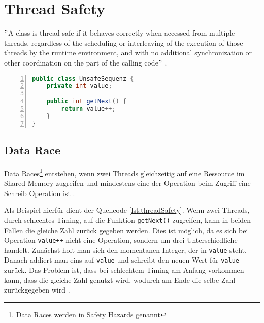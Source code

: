 \section{Thread Safety}\label{sec:threadSafety}

$"$A class is thread-safe if it behaves correctly when accessed from multiple threads, regardless of the scheduling or interleaving of the execution of those threads by the runtime environment, and with no additional synchronization or other coordination on the part of the calling code$"$ \cite[12]{brian}.

\begin{lstlisting}[language=Java,frame=tb,caption={Non-thread-safe Sequence Generator \cite{brian}}, label={lst:threadSafety}, numbers=left, stepnumber=1]
public class UnsafeSequenz {
	private int value;

	public int getNext() {
		return value++;
	}
}
\end{lstlisting}

\subsection*{Data Race}

Data Races\footnote{Data Races werden in \cite{brian} Safety Hazards genannt} entstehen, wenn zwei Threads gleichzeitig auf eine Ressource im Shared Memory zugreifen und mindestens eine der Operation beim Zugriff eine Schreib Operation ist \cite[vgl.][72]{banerjee_theory_2006}. 

Als Beispiel hierfür dient der Quellcode \ref{lst:threadSafety}. Wenn zwei Threads, durch schlechtes Timing, auf die Funktion \texttt{getNext()} zugreifen, kann in beiden Fällen die gleiche Zahl zurück gegeben werden. Dies ist möglich, da es sich bei Operation \texttt{value++} nicht eine Operation, sondern um drei Unterschiedliche handelt. Zunächst holt man sich den momentanen Integer, der in \texttt{value} steht. Danach addiert man eins auf \texttt{value} und schreibt den neuen Wert für \texttt{value} zurück. Das Problem ist, dass bei schlechtem Timing am Anfang vorkommen kann, dass die gleiche Zahl genutzt wird, wodurch am Ende die selbe Zahl zurückgegeben wird \cite[vgl.][5]{brian}.

